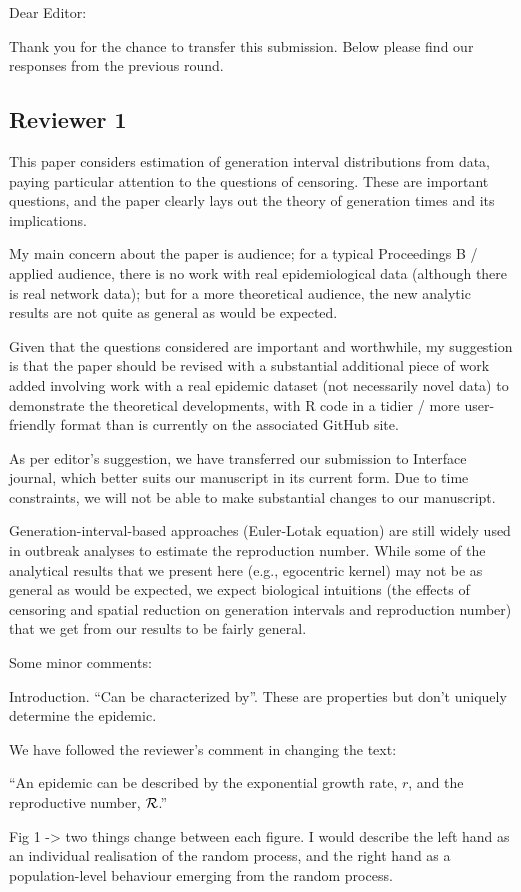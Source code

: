 \documentclass[12pt]{article}
\newcommand{\RR}{\ensuremath{{\cal R}}}
\newcommand{\rev}{\subsection*}
\newcommand{\revtext}{\textsf}
\begin{document}
\noindent Dear Editor:

Thank you for the chance to transfer this submission. 
Below please find our responses from the previous round.

\rev{Reviewer 1}

\revtext{This paper considers estimation of generation interval distributions from data, paying particular attention to the questions of censoring. These are important questions, and the paper clearly lays out the theory of generation times and its implications.}

\revtext{My main concern about the paper is audience; for a typical Proceedings B / applied audience, there is no work with real epidemiological data (although there is real network data); but for a more theoretical audience, the new analytic results are not quite as general as would be expected.}

\revtext{Given that the questions considered are important and worthwhile, my suggestion is that the paper should be revised with a substantial additional piece of work added involving work with a real epidemic dataset (not necessarily novel data) to demonstrate the theoretical developments, with R code in a tidier / more user-friendly format than is currently on the associated GitHub site.
}

As per editor's suggestion, we have transferred our submission to Interface journal, which better suits our manuscript in its current form. Due to time constraints, we will not be able to make substantial changes to our manuscript.

Generation-interval-based approaches (Euler-Lotak equation) are still widely used in outbreak analyses to estimate the reproduction number. While some of the analytical results that we present here (e.g., egocentric kernel) may not be as general as would be expected, we expect biological intuitions (the effects of censoring and spatial reduction on generation intervals and reproduction number) that we get from our results to be fairly general. 


\revtext{Some minor comments:}

\revtext{Introduction. “Can be characterized by”. These are properties but don’t uniquely determine the epidemic.}

We have followed the reviewer's comment in changing the text:

``An epidemic can be described by the exponential growth rate, $r$, and the reproductive number, \RR.''

\revtext{Fig 1 -> two things change between each figure. I would describe the left hand as an individual realisation of the random process, and the right hand as a population-level behaviour emerging from the random process.}
\end{document}
